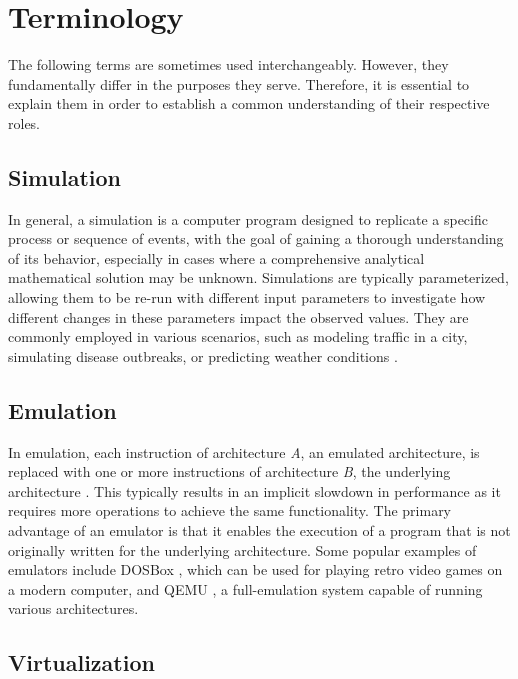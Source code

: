 \documentclass[english, ing, kiv, he, iso690numb, pdf]{fasthesis}
\begin{document}
	\section{Terminology}
	
	The following terms are sometimes used interchangeably. However, they fundamentally differ in the purposes they serve. Therefore, it is essential to explain them in order to establish a common understanding of their respective roles.
	
	\subsection{Simulation}
	
	In general, a simulation is a computer program designed to replicate a specific process or sequence of events, with the goal of gaining a thorough understanding of its behavior, especially in cases where a comprehensive analytical mathematical solution may be unknown. Simulations are typically parameterized, allowing them to be re-run with different input parameters to investigate how different changes in these parameters impact the observed values. They are commonly employed in various scenarios, such as modeling traffic in a city, simulating disease outbreaks, or predicting weather conditions \cite{computer-simulations}.
	
	\subsection{Emulation} \label{subsection-Emulation}
	
	In emulation, each instruction of architecture \textit{A}, an emulated architecture, is replaced with one or more instructions of architecture \textit{B}, the underlying architecture \cite{computer-emulation}. This typically results in an implicit slowdown in performance as it requires more operations to achieve the same functionality. The primary advantage of an emulator is that it enables the execution of a program that is not originally written for the underlying architecture. Some popular examples of emulators include \break DOSBox \cite{DOSBox}, which can be used for playing retro video games on a modern computer, and QEMU \cite{QEMU}, a full-emulation system capable of running various architectures.
	
	\subsection{Virtualization}
	
\end{document}
